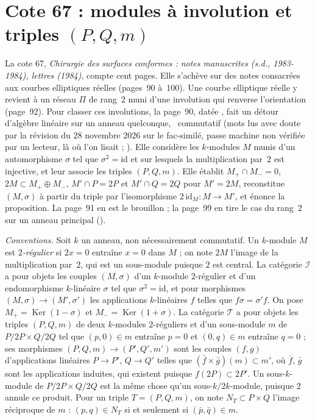 \section[Cote 67 : modules à involution et triples (P, Q, m)]{Cote 67 : modules à involution et triples $(P, Q, m)$\protect{}}\label{sec:67}

La cote 67, \emph{Chirurgie des surfaces conformes : notes manuscrites (s.d., 1983-1984), lettres (1984)}, compte cent pages. Elle s'achève sur des notes consacrées aux courbes elliptiques réelles (pages~90 à~100). Une courbe elliptique réelle y revient à un réseau $\Pi$ de rang~$2$ muni d'une involution qui renverse l'orientation (page~92). Pour classer ces involutions, la page~90, datée , fait un détour d'algèbre linéaire sur un anneau quelconque, \ commutatif (mots lus avec doute par la révision du 28 novembre 2026 sur le fac-similé, passe machine non vérifiée par un lecteur, là où l'on lisait  ; ). Elle considère les $k$-modules $M$ munis d'un automorphisme $\sigma$ tel que $\sigma^2 = \mathrm{id}$ et sur lesquels la multiplication par~$2$ est injective, et leur associe les triples $(P, Q, m)$. Elle établit $M_+ \cap M_- = 0$, $2M \subset M_+ \oplus M_-$, $M' \cap P = 2P$ et $M' \cap Q = 2Q$ pour $M' = 2M$, reconstitue $(M, \sigma)$ à partir du triple par l'isomorphisme $2\,\mathrm{id}_M : M \to M'$, et énonce la proposition. La page~91 en est le brouillon ; la page~99 en tire le cas du rang~$2$ sur un anneau principal ().

\noindent\emph{Conventions.} Soit $k$ un anneau, non nécessairement commutatif. Un $k$-module $M$ est \emph{$2$-régulier} si $2x = 0$ entraîne $x = 0$ dans $M$ ; on note $2M$ l'image de la multiplication par~$2$, qui est un sous-module puisque $2$ est central. La catégorie $\mathcal I$ a pour objets les couples $(M, \sigma)$ d'un $k$-module $2$-régulier et d'un endomorphisme $k$-linéaire $\sigma$ tel que $\sigma^2 = \mathrm{id}$, et pour morphismes $(M, \sigma) \to (M', \sigma')$ les applications $k$-linéaires $f$ telles que $f\sigma = \sigma' f$. On pose $M_+ = \operatorname{Ker}(1 - \sigma)$ et $M_- = \operatorname{Ker}(1 + \sigma)$. La catégorie $\mathcal T$ a pour objets les triples $(P, Q, m)$ de deux $k$-modules $2$-réguliers et d'un sous-module $m$ de $P/2P \times Q/2Q$ tel que $(p, 0) \in m$ entraîne $p = 0$ et $(0, q) \in m$ entraîne $q = 0$ ; ses morphismes $(P, Q, m) \to (P', Q', m')$ sont les couples $(f, g)$ d'applications linéaires $P \to P'$, $Q \to Q'$ telles que $(\bar f \times \bar g)(m) \subset m'$, où $\bar f$, $\bar g$ sont les applications induites, qui existent puisque $f(2P) \subset 2P'$. Un sous-$k$-module de $P/2P \times Q/2Q$ est la même chose qu'un sous-$k/2k$-module, puisque $2$ annule ce produit. Pour un triple $T = (P, Q, m)$, on note $N_T \subset P \times Q$ l'image réciproque de $m$ : $(p, q) \in N_T$ si et seulement si $(\bar p, \bar q) \in m$.

